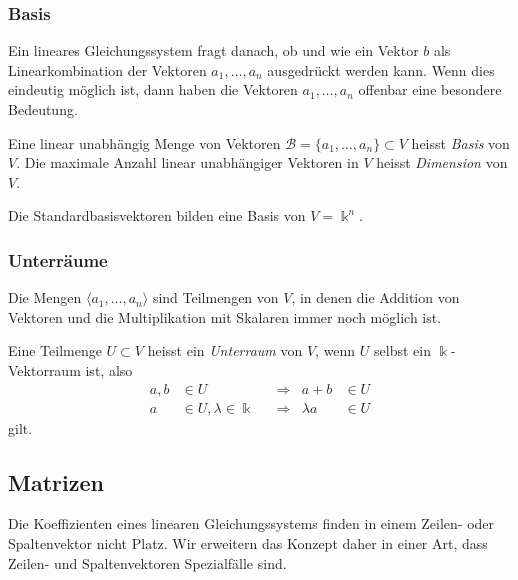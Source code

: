 \subsubsection{Basis}
Ein lineares Gleichungssystem fragt danach, ob und wie ein Vektor $b$ als
Linearkombination der Vektoren $a_1,\dots,a_n$ ausgedrückt werden kann.
Wenn dies eindeutig möglich ist, dann haben die Vektoren $a_1,\dots,a_n$
offenbar eine besondere Bedeutung.

\begin{definition}
%
%
Eine linear unabhängig Menge von Vektoren
$\mathcal{B}=\{a_1,\dots,a_n\}\subset V$
heisst {\em Basis} von $V$.
Die maximale Anzahl linear unabhängiger Vektoren in $V$ heisst
{\em Dimension} von $V$.
\end{definition}

Die Standardbasisvektoren bilden eine Basis von $V=\Bbbk^n$.

\subsubsection{Unterräume}
Die Mengen $\langle a_1,\dots,a_n\rangle$ sind Teilmengen
von $V$, in denen die Addition von Vektoren und die Multiplikation mit
Skalaren immer noch möglich ist.

\begin{definition}
Eine Teilmenge $U\subset V$ heisst ein {\em Unterraum} von $V$, wenn
%
$U$ selbst ein $\Bbbk$-Vektorraum ist, also
\[
\begin{aligned}
a,b&\in U &&\Rightarrow &a+b&\in U
\\
a&\in U, \lambda\in\Bbbk &&\Rightarrow & \lambda a&\in U
\end{aligned}
\]
gilt.
\end{definition}

%
%
\subsection{Matrizen
\label{buch:grundlagen:subsection:matrizen}}
Die Koeffizienten eines linearen Gleichungssystems finden in einem
Zeilen- oder Spaltenvektor nicht Platz.
Wir erweitern das Konzept daher in einer Art, dass Zeilen- und
Spaltenvektoren Spezialfälle sind.

